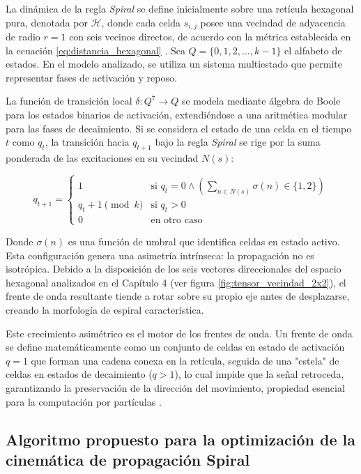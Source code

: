 La dinámica de la regla \textit{Spiral} se define inicialmente sobre una retícula hexagonal pura, denotada por $\mathcal{H}$, donde cada celda $s_{i,j}$ posee una vecindad de adyacencia de radio $r=1$ con seis vecinos directos, de acuerdo con la métrica establecida en la ecuación \eqref{eq:distancia_hexagonal} %
. Sea $Q = \{0, 1, 2, \dots, k-1\}$ el alfabeto de estados. En el modelo analizado, se utiliza un sistema multiestado que permite representar fases de activación y reposo.

La función de transición local $\delta: Q^7 \to Q$ se modela mediante álgebra de Boole para los estados binarios de activación, extendiéndose a una aritmética modular para las fases de decaimiento. Si se considera el estado de una celda en el tiempo $t$ como $q_t$, la transición hacia $q_{t+1}$ bajo la regla \textit{Spiral} se rige por la suma ponderada de las excitaciones en su vecindad $N(s)$:

\begin{equation}
q_{t+1} = 
\begin{cases} 
1 & \text{si } q_t = 0 \wedge \left( \sum_{n \in N(s)} \sigma(n) \in \{1, 2\} \right) \\
q_t + 1 \pmod{k} & \text{si } q_t > 0 \\
0 & \text{en otro caso}
\end{cases}
\label{eq:regla_spiral_hex}
\end{equation}

Donde $\sigma(n)$ es una función de umbral que identifica celdas en estado activo. Esta configuración genera una asimetría intrínseca: la propagación no es isotrópica. Debido a la disposición de los seis vectores direccionales del espacio hexagonal analizados en el Capítulo 4 (ver figura \ref{fig:tensor_vecindad_2x2}), el frente de onda resultante tiende a rotar sobre su propio eje antes de desplazarse, creando la morfología de espiral característica.

Este crecimiento asimétrico es el motor de los frentes de onda. Un frente de onda se define matemáticamente como un conjunto de celdas en estado de activación $q=1$ que forman una cadena conexa en la retícula, seguida de una "estela" de celdas en estados de decaimiento ($q > 1$), lo cual impide que la señal retroceda, garantizando la preservación de la dirección del movimiento, propiedad esencial para la computación por partículas \cite{Basurto2009}.

\subsection{Algoritmo propuesto para la optimización de la cinemática de propagación Spiral}
\label{subsec:algoritmo_spiral_optimizado}

